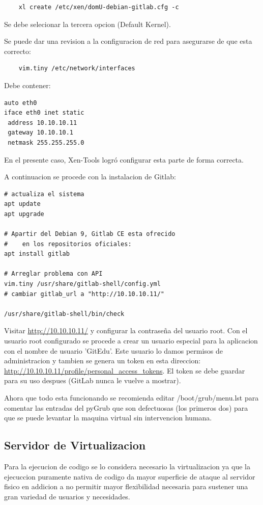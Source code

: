 \begin{lstlisting}
	xl create /etc/xen/domU-debian-gitlab.cfg -c
\end{lstlisting}

Se debe selecionar la tercera opcion (Default Kernel).

Se puede dar una revision a la configuracion de red para asegurarse de que esta correcto:

\begin{lstlisting}
	vim.tiny /etc/network/interfaces
\end{lstlisting}

Debe contener:

\begin{lstlisting}
auto eth0
iface eth0 inet static
 address 10.10.10.11
 gateway 10.10.10.1
 netmask 255.255.255.0
\end{lstlisting}

En el presente caso, Xen-Tools logró configurar esta parte de forma correcta.

A continuacion se procede con la instalacion de Gitlab:

\begin{lstlisting}
# actualiza el sistema
apt update
apt upgrade

# Apartir del Debian 9, Gitlab CE esta ofrecido
#    en los repositorios oficiales:
apt install gitlab

# Arreglar problema con API
vim.tiny /usr/share/gitlab-shell/config.yml
# cambiar gitlab_url a "http://10.10.10.11/"

/usr/share/gitlab-shell/bin/check
\end{lstlisting}

Visitar \url{http://10.10.10.11/} y configurar la contraseña del usuario root. Con el usuario root configurado se procede a crear un usuario especial para la aplicacion con el nombre de usuario 'GitEdu'. Este usuario lo damos permisos de administracion y tambien se genera un token en esta direccion: \url{http://10.10.10.11/profile/personal_access_tokens}. El token se debe guardar para su uso despues (GitLab nunca le vuelve a mostrar).

Ahora que todo esta funcionando se recomienda editar /boot/grub/menu.lst para comentar las entradas del pyGrub que son defectuosas (los primeros dos) para que se puede levantar la maquina virtual sin intervencion humana.

\pagebreak

\subsection{Servidor de Virtualizacion}
Para la ejecucion de codigo se lo considera necesario la virtualizacion ya que la ejecuccion puramente nativa de codigo da mayor superficie de ataque al servidor fisico en addicion a no permitir mayor flexibilidad necesaria para sustener una gran variedad de usuarios y necesidades.

